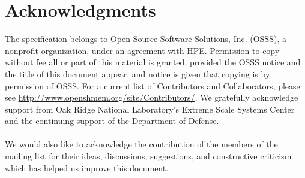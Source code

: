 \date{\today}

\section*{Acknowledgments}
The \openshmem specification belongs to Open Source Software Solutions, Inc.
(OSSS), a nonprofit organization, under an agreement with HPE.
Permission to copy without fee all or part of this material is granted,
provided the OSSS notice and the title of this document appear, and notice is
given that copying is by permission of OSSS.
For a current list
of Contributors and Collaborators, please see
  \url{http://www.openshmem.org/site/Contributors/}.
We gratefully acknowledge support from
Oak Ridge National Laboratory's
Extreme Scale Systems Center and the continuing support of the Department of Defense.\\
\\
We would also like to acknowledge the contribution of the members of the
\openshmem mailing list for their ideas, discussions, suggestions, and
constructive criticism which has helped us improve this document.\\
